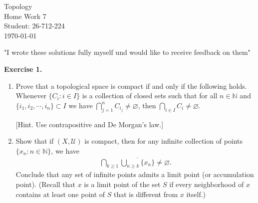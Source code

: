 \documentclass[12pt]{article}
\begin{document}
\begin{titlepage}
\centering
\vspace*{\fill}
{\Huge Topology} \\[0.5cm]
{\Huge Home Work 7}\\[1.5cm]
{\Large Student: 26-712-224}\\[0.5cm]
{\Large \today}\par

\vspace{2cm}
{\normalsize "I wrote these solutions fully myself und would like to receive feedback on them"\par}

\vspace*{\fill}
\end{titlepage}

\newpage
\noindent\textbf{Exercise 1.}
\begin{enumerate}[label=\roman*)]
  \item Prove that a topological space is compact if and only if the following holds.
  Whenever $\{C_i : i\in I\}$ is a collection of closed sets such that for all
  $n\in\mathbb{N}$ and $\{i_1,i_2,\cdots,i_n\}\subset I$ we have
  $\bigcap_{j=1}^{n}C_{i_j}\neq\varnothing$, then
  $\bigcap_{i\in I}C_i\neq\varnothing$.

  [Hint. Use contrapositive and De Morgan's law.]

  \item Show that if $(X,\mathcal{U})$ is compact, then for any infinite collection
  of points $\{x_n : n\in\mathbb{N}\}$, we have
  \begin{align*}
    \bigcap_{k\geq 1}\overline{\bigcup_{n\geq k}\{x_n\}}\neq\varnothing.
  \end{align*}
  Conclude that any set of infinite points admits a limit point (or accumulation point).
  (Recall that $x$ is a limit point of the set $S$ if every neighborhood of $x$
  contains at least one point of $S$ that is different from $x$ itself.)
\end{enumerate}
\end{document}
